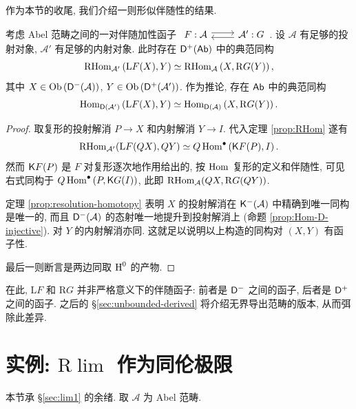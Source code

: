 作为本节的收尾, 我们介绍一则形似伴随性的结果.

\begin{theorem}\label{prop:RHom-adjoint-bounded}
	考虑 Abel 范畴之间的一对伴随加性函子
	$\begin{tikzcd}
		F: \mathcal{A} \arrow[r, shift left] & \mathcal{A}' \arrow[l, shift left] : G
	\end{tikzcd}$.
	设 $\mathcal{A}$ 有足够的投射对象, $\mathcal{A}'$ 有足够的内射对象. 此时存在 $\mathsf{D}^+(\mathsf{Ab})$ 中的典范同构
	\[ \operatorname{RHom}_{\mathcal{A'}}\left(\mathrm{L}F(X), Y\right) \simeq \operatorname{RHom}_{\mathcal{A}}\left(X, \mathrm{R}G(Y) \right), \]
	其中 $X \in \operatorname{Ob}\left(\mathsf{D}^-(\mathcal{A})\right)$, $Y \in \operatorname{Ob}\left(\mathsf{D}^+(\mathcal{A}')\right)$. 作为推论, 存在 $\mathsf{Ab}$ 中的典范同构
	\[ \operatorname{Hom}_{\mathsf{D}(\mathcal{A'})}\left(\mathrm{L}F(X), Y\right) \simeq \operatorname{Hom}_{\mathsf{D}(\mathcal{A})}\left(X, \mathrm{R}G(Y) \right). \]
\end{theorem}
\begin{proof}
	取复形的投射解消 $P \to X$ 和内射解消 $Y \to I$. 代入定理 \ref{prop:RHom} 遂有
	\[ \operatorname{RHom}_{\mathcal{A}'}(\mathrm{L}F(QX), QY) \simeq Q\operatorname{Hom}^\bullet\left( \mathsf{K}F(P), I \right). \]
	然而 $\mathsf{K}F(P)$ 是 $F$ 对复形逐次地作用给出的, 按 $\operatorname{Hom}$ 复形的定义和伴随性, 可见右式同构于 $Q\operatorname{Hom}^\bullet\left( P, \mathsf{K}G(I) \right)$, 此即 $\operatorname{RHom}_{\mathcal{A}}(QX, \mathrm{R}G(QY))$.
	
	定理 \ref{prop:resolution-homotopy} 表明 $X$ 的投射解消在 $\mathsf{K}^-(\mathcal{A})$ 中精确到唯一同构是唯一的, 而且 $\mathsf{D}^-(\mathcal{A})$ 的态射唯一地提升到投射解消上 (命题 \ref{prop:Hom-D-injective}). 对 $Y$ 的内射解消亦同. 这就足以说明以上构造的同构对 $(X, Y)$ 有函子性.
	
	最后一则断言是两边同取 $\operatorname{H}^0$ 的产物.
\end{proof}

在此, $\mathrm{L}F$ 和 $\mathrm{R}G$ 并非严格意义下的伴随函子: 前者是 $\mathsf{D}^-$ 之间的函子, 后者是 $\mathsf{D}^+$ 之间的函子. 之后的 \S\ref{sec:unbounded-derived} 将介绍无界导出范畴的版本, 从而弭除此差异.

\section{实例: \texorpdfstring{$\mathrm{R}\lim$}{Rlim} 作为同伦极限}\label{sec:Rlim}
本节承 \S\ref{sec:lim1} 的余绪. 取 $\mathcal{A}$ 为 Abel 范畴.

